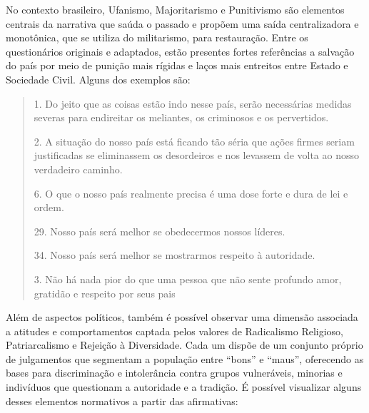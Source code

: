 \documentclass[
12pt,				%
openright,			%
twoside,			%
a4paper,			%
english,			%
french,				%
spanish,			%
brazil				%
]{abntex2}
\begin{document}
No contexto brasileiro, Ufanismo, Majoritarismo e Punitivismo são elementos centrais da narrativa que saúda o passado e propõem uma saída centralizadora e monotônica, que se utiliza do militarismo, para restauração. Entre os questionários originais e adaptados, estão presentes fortes referências a salvação do país por meio de punição mais rígidas e laços mais entreitos entre Estado e Sociedade Civil. Alguns dos exemplos são:

\begin{quote}
	1. Do jeito que as coisas estão indo nesse país, serão necessárias medidas severas para endireitar os meliantes, os criminosos e os pervertidos.
	
	2. A situação do nosso país está ficando tão séria que ações firmes seriam justificadas se eliminassem os desordeiros e nos levassem de volta ao nosso verdadeiro caminho.
	
	6. O que o nosso país realmente precisa é uma dose forte e dura de lei e ordem.
	
	29. Nosso país será melhor se obedecermos nossos líderes.
	
	34. Nosso país será melhor se mostrarmos respeito à autoridade.
	
	3. Não há nada pior do que uma pessoa que não sente profundo amor, gratidão e respeito por seus pais
	
	\cite{vilanova2018adaptaccao, de2018analises}
	
\end{quote}  

Além de aspectos políticos, também é possível observar uma dimensão associada a atitudes e comportamentos captada pelos valores de Radicalismo Religioso, Patriarcalismo e Rejeição à Diversidade. Cada um dispõe de um conjunto próprio de julgamentos que segmentam a população entre ``bons'' e ``maus'', oferecendo as bases para discriminação e intolerância contra grupos vulneráveis, minorias e indivíduos que questionam a autoridade e a tradição. É possível visualizar alguns desses elementos normativos a partir das afirmativas:
 
\end{document}
